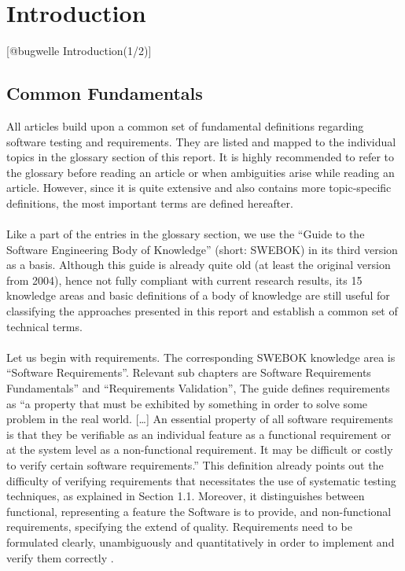 \chapter{Introduction}
[@bugwelle Introduction(1/2)]

\section{Common Fundamentals }
All articles build upon a common set of fundamental definitions regarding software testing and requirements. They are listed and mapped to the individual topics in the glossary section of this report. It is highly recommended to refer to the glossary before reading an article or when ambiguities arise while reading an article. However, since it is quite extensive and also contains more topic-specific definitions, the most important terms are defined hereafter.\\
\\
Like a part of the entries in the glossary section, we use the “Guide to the Software Engineering Body of Knowledge” (short: SWEBOK) in its third version as a basis. Although this guide is already quite old (at least the original version from 2004), hence not fully compliant with current research results, its 15 knowledge areas and basic definitions of a body of knowledge are still useful for classifying the approaches presented in this report and establish a common set of technical terms.\\
\\ 
Let us begin with requirements. The corresponding SWEBOK knowledge area is “Software Requirements”. Relevant sub chapters are Software Requirements Fundamentals” and “Requirements Validation”, The guide defines requirements as “a property that must be exhibited by something in order to solve some problem in the real world. […] An essential property of all software requirements is that they be verifiable as an individual feature as a functional requirement or at the system level as a non-functional requirement. It may be difficult or costly to verify certain software requirements.” \cite{SWEBOK} This definition already points out the difficulty of verifying requirements that necessitates the use of systematic testing techniques, as explained in Section 1.1. Moreover, it distinguishes between functional, representing a feature the Software is to provide, and non-functional requirements, specifying the extend of quality. Requirements need to be formulated clearly, unambiguously and quantitatively in order to implement and verify them correctly \cite{SWEBOK}.\\
